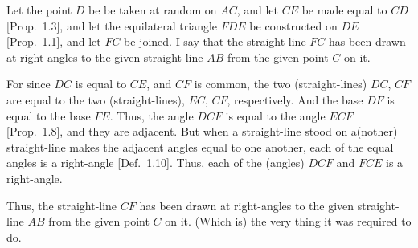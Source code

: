 \begin{Parallel}{}{}
{Let the point $D$ be be taken at random on $AC$, and let $CE$ be made equal to $CD$ [Prop.~1.3], and let the equilateral triangle $FDE$
be constructed on $DE$ [Prop.~1.1], and let $FC$ be
joined. I say that the straight-line $FC$ has been drawn at right-angles
to the given straight-line $AB$ from the given point $C$ on it.

For since $DC$ is equal to $CE$, and $CF$ is common, the two (straight-lines) $DC$, $CF$
are equal to the two (straight-lines), $EC$, $CF$, respectively.  And the base $DF$
is equal to the base $FE$. Thus, the angle $DCF$ is equal to the
angle $ECF$ [Prop.~1.8], and they are adjacent. But when a straight-line stood on 
a(nother) straight-line makes the adjacent angles equal to one another, each of the
equal angles is a right-angle [Def.~1.10]. Thus, each of the (angles)
$DCF$ and $FCE$ is a right-angle.

Thus, the straight-line $CF$ has been drawn at right-angles to the
given straight-line $AB$ from the given point $C$ on it. (Which is) the very thing
it was required to do.}
\end{Parallel}

